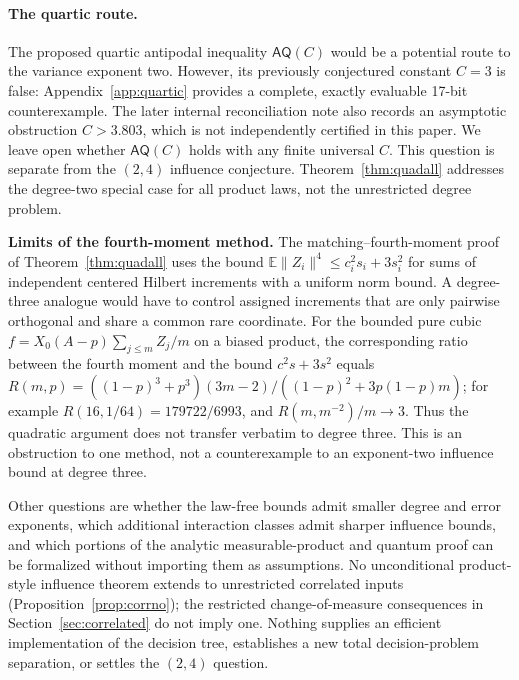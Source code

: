 \documentclass[11pt]{article}
\numberwithin{equation}{section}
\theoremstyle{remark}
\newcommand{\E}{\mathbb E}
\begin{document}
\paragraph{The quartic route.}
The proposed quartic antipodal inequality $\mathsf{AQ}(C)$ would be a
potential route to the variance exponent two. However, its previously
conjectured constant $C=3$ is false: Appendix~\ref{app:quartic}
provides a complete, exactly evaluable 17-bit counterexample.
The later internal reconciliation note also records an asymptotic
obstruction $C>3.803$, which is not independently certified in this paper.
We leave open whether $\mathsf{AQ}(C)$ holds with any finite universal $C$.
This question is separate from the $(2,4)$ influence conjecture. Theorem~\ref{thm:quadall} addresses the degree-two special case for all product laws, not the unrestricted degree problem.\par\medskip\noindent\textbf{Limits of the fourth-moment method.} The matching--fourth-moment proof of Theorem~\ref{thm:quadall} uses the bound $\E\|Z_i\|^4\le c_i^2s_i+3s_i^2$ for sums of independent centered Hilbert increments with a uniform norm bound. A degree-three analogue would have to control assigned increments that are only pairwise orthogonal and share a common rare coordinate. For the bounded pure cubic $f=X_0(A-p)\sum_{j\le m}Z_j/m$ on a biased product, the corresponding ratio between the fourth moment and the bound $c^2s+3s^2$ equals $R(m,p)=((1-p)^3+p^3)(3m-2)/((1-p)^2+3p(1-p)m)$; for example $R(16,1/64)=179722/6993$, and $R(m,m^{-2})/m\to3$. Thus the quadratic argument does not transfer verbatim to degree three. This is an obstruction to one method, not a counterexample to an exponent-two influence bound at degree three.

Other questions are whether the law-free bounds admit smaller degree and error exponents, which additional interaction classes admit sharper influence bounds, and which portions of the analytic measurable-product and quantum proof can be formalized without importing them as assumptions. No unconditional product-style influence theorem extends to unrestricted correlated inputs (Proposition~\ref{prop:corrno}); the restricted change-of-measure consequences in Section~\ref{sec:correlated} do not imply one. Nothing supplies an efficient implementation of the decision tree, establishes a new total decision-problem separation, or settles the $(2,4)$ question.
\end{document}
